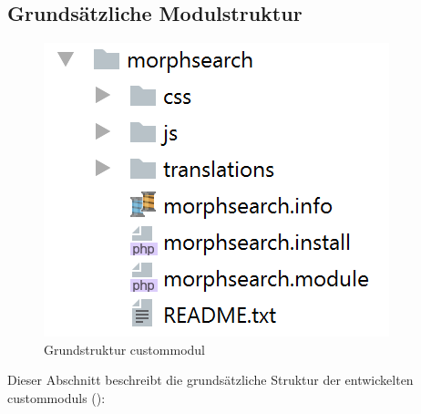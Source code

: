 \subsection{Grundsätzliche Modulstruktur}\label{sub:strukture_module}
\begin{figure}
	\centering
	\includegraphics[height=0.2\textheight]{images/structure_module}
	\caption{Grundstruktur \gls{custommodul}}
	\label{fig:structuremodule}
\end{figure}

Dieser Abschnitt beschreibt die grundsätzliche Struktur der entwickelten \glspl{custommodul} ():

